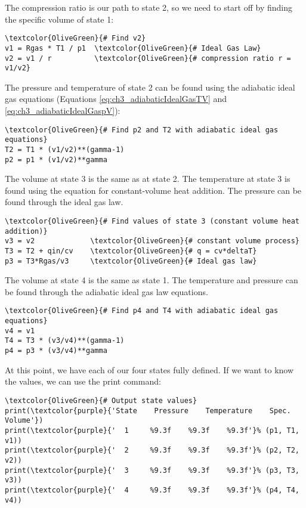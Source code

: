 The compression ratio is our path to state 2, so we need to start off by finding the specific volume of state 1:

\begin{Verbatim}[commandchars=\\\{\}]
\textcolor{OliveGreen}{# Find v2}                
v1 = Rgas * T1 / p1  \textcolor{OliveGreen}{# Ideal Gas Law}
v2 = v1 / r          \textcolor{OliveGreen}{# compression ratio r = v1/v2}
\end{Verbatim}

The pressure and temperature of state 2 can be found using the adiabatic ideal gas equations (Equations \ref{eq:ch3_adiabaticIdealGasTV} and \ref{eq:ch3_adiabaticIdealGaspV}):

\begin{Verbatim}[commandchars=\\\{\}]
\textcolor{OliveGreen}{# Find p2 and T2 with adiabatic ideal gas equations}                
T2 = T1 * (v1/v2)**(gamma-1)
p2 = p1 * (v1/v2)**gamma  
\end{Verbatim}

The volume at state 3 is the same as at state 2.  The temperature at state 3 is found using the equation for constant-volume heat addition.  The pressure can be found through the ideal gas law.
\begin{Verbatim}[commandchars=\\\{\}]
\textcolor{OliveGreen}{# Find values of state 3 (constant volume heat addition)}                
v3 = v2             \textcolor{OliveGreen}{# constant volume process}
T3 = T2 + qin/cv    \textcolor{OliveGreen}{# q = cv*deltaT}
p3 = T3*Rgas/v3     \textcolor{OliveGreen}{# Ideal gas law}
\end{Verbatim}

The volume at state 4 is the same as state 1.  The temperature and pressure can be found through the adiabatic ideal gas law equations.

\begin{Verbatim}[commandchars=\\\{\}]
\textcolor{OliveGreen}{# Find p4 and T4 with adiabatic ideal gas equations}                
v4 = v1
T4 = T3 * (v3/v4)**(gamma-1)
p4 = p3 * (v3/v4)**gamma  
\end{Verbatim}

At this point, we have each of our four states fully defined.  If we want to know the values, we can use the print command:

\begin{Verbatim}[commandchars=\\\{\}]
\textcolor{OliveGreen}{# Output state values}                
print(\textcolor{purple}{'State    Pressure    Temperature    Spec. Volume'})
print(\textcolor{purple}{'  1     %9.3f    %9.3f    %9.3f'}% (p1, T1, v1))
print(\textcolor{purple}{'  2     %9.3f    %9.3f    %9.3f'}% (p2, T2, v2))
print(\textcolor{purple}{'  3     %9.3f    %9.3f    %9.3f'}% (p3, T3, v3))
print(\textcolor{purple}{'  4     %9.3f    %9.3f    %9.3f'}% (p4, T4, v4))
\end{Verbatim}

